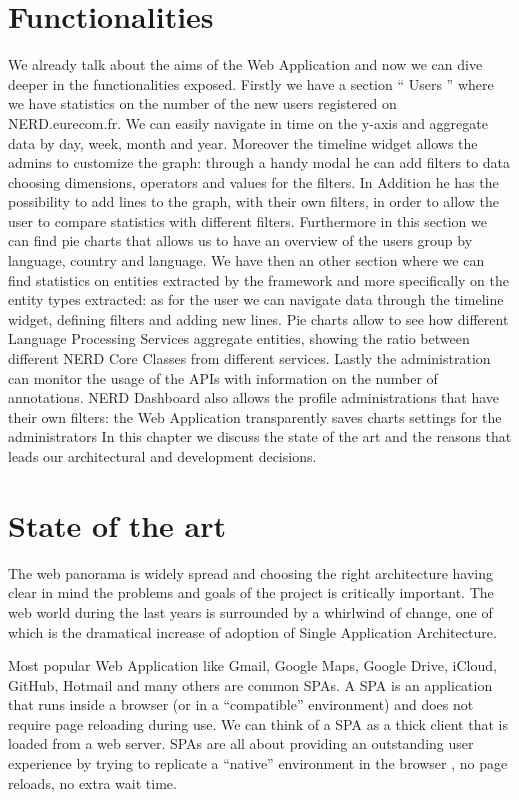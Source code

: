\documentclass[a4paper,13pt]{report}
\begin{document}
\section{Functionalities}
    We already talk about the aims of the Web Application and now we can dive deeper in the functionalities exposed.
    Firstly we have a section `` Users '' where we have statistics on the number of the new users registered on NERD.eurecom.fr. We can easily navigate in time on the y-axis and aggregate data by day, week, month and year. Moreover the timeline widget allows the admins to customize the graph: through a handy modal he can add filters to data choosing dimensions, operators and values for the filters. In Addition he has the possibility to add lines to the graph, with their own filters, in order to allow the user to compare statistics with different filters.
    Furthermore in this section we can find pie charts that allows us to have an overview of the users group by language, country and language.
    We have then an other section where we can find statistics on entities extracted by the framework and more specifically on the entity types extracted: as for the user we can navigate data through the timeline widget, defining filters and adding new lines. Pie charts allow to see how different Language Processing Services aggregate entities, showing the ratio between different NERD Core Classes from different services.
    Lastly the administration can monitor the usage of the APIs with information on the number of annotations.
    NERD Dashboard also allows the profile administrations that have their own filters: the Web Application transparently saves charts settings for the administrators
   In this chapter we discuss the state of the art and the reasons that leads our architectural and development decisions.

\section{State of the art}
The web panorama is widely spread and choosing the right architecture having clear in mind the problems and goals of the project is critically important. 
The web world during the last years is surrounded by a whirlwind of change, one of which is the dramatical increase of adoption of Single Application Architecture.\newline

Most popular Web Application like Gmail, Google Maps, Google Drive, iCloud, GitHub, Hotmail and many others are common SPAs.
A SPA is an application that runs inside a browser (or in a ``compatible'' environment) and does not require page reloading during use. We can think of a SPA as a thick client that is loaded from a web server. 
SPAs are all about providing an outstanding user experience by trying to replicate a ``native'' environment in the browser , no page reloads, no extra wait time.
\end{document}
